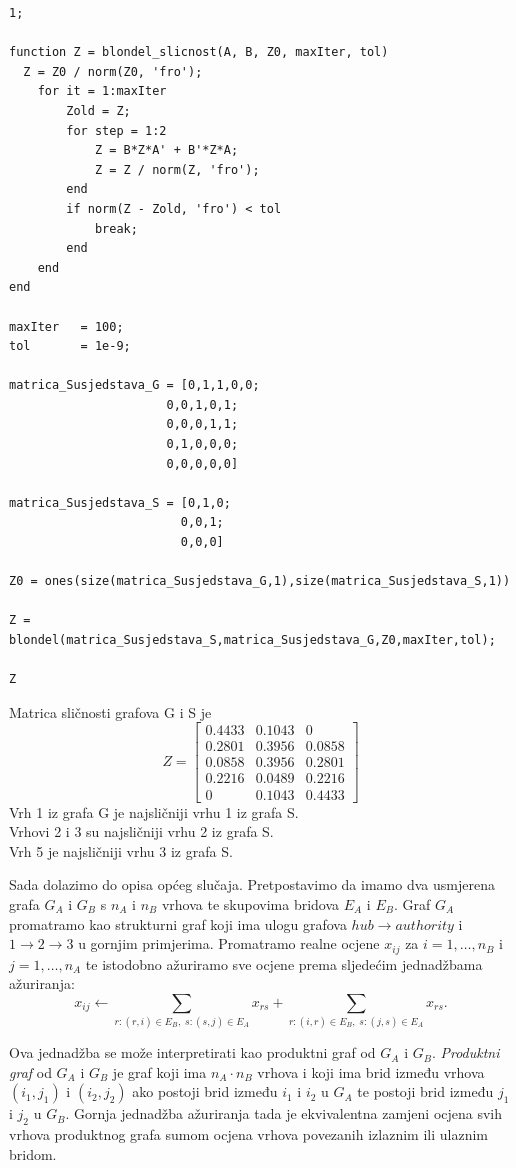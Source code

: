 \documentclass[12pt, letterpaper]{article}
\numberwithin{figure}{section}
\begin{document}
\begin{lstlisting}[style=octave, caption={Implementacija algoritma u Octaveu}, label={lst:blondel}]
1;

function Z = blondel_slicnost(A, B, Z0, maxIter, tol)
  Z = Z0 / norm(Z0, 'fro');
    for it = 1:maxIter
        Zold = Z;
        for step = 1:2
            Z = B*Z*A' + B'*Z*A;
            Z = Z / norm(Z, 'fro');
        end
        if norm(Z - Zold, 'fro') < tol
            break;
        end
    end
end

maxIter   = 100;
tol       = 1e-9;

matrica_Susjedstava_G = [0,1,1,0,0;
                      0,0,1,0,1;
                      0,0,0,1,1;
                      0,1,0,0,0;
                      0,0,0,0,0]

matrica_Susjedstava_S = [0,1,0;
                        0,0,1;
                        0,0,0]

Z0 = ones(size(matrica_Susjedstava_G,1),size(matrica_Susjedstava_S,1))

Z = blondel(matrica_Susjedstava_S,matrica_Susjedstava_G,Z0,maxIter,tol);

Z
\end{lstlisting}
Matrica sličnosti grafova G i S je
\[
Z =
\begin{bmatrix}
0.4433 & 0.1043 & 0 \\
0.2801 & 0.3956 & 0.0858 \\
0.0858 & 0.3956 & 0.2801 \\
0.2216 & 0.0489 & 0.2216 \\
0 & 0.1043 & 0.4433
\end{bmatrix}
\]
Vrh 1 iz grafa G je najsličniji vrhu 1 iz grafa S.\\
Vrhovi 2 i 3 su najsličniji vrhu 2 iz grafa S.\\
Vrh 5 je najsličniji vrhu 3 iz grafa S.

Sada dolazimo do opisa općeg slučaja. Pretpostavimo da imamo dva usmjerena grafa $G_A$ i $G_B$ s $n_A$ i $n_B$ vrhova te skupovima bridova $E_A$ i $E_B$. Graf $G_A$ promatramo kao strukturni graf koji ima ulogu grafova $\mathit{hub} \longrightarrow \mathit{authority}$ i $1 \longrightarrow 2 \longrightarrow 3$ u gornjim primjerima. Promatramo realne ocjene $x_{ij}$ za $i = 1, \dots, n_B$ i $j = 1, \dots, n_A$ te istodobno ažuriramo sve ocjene prema sljedećim jednadžbama ažuriranja:
\[
x_{ij} \leftarrow \sum_{r:(r,i)\in E_B,\; s:(s,j)\in E_A} x_{rs} + \sum_{r:(i,r)\in E_B,\; s:(j,s)\in E_A} x_{rs}.
\]


Ova jednadžba se može interpretirati kao produktni graf od $G_A$ i $G_B$. \emph{Produktni graf} od $G_A$ i $G_B$ je graf koji ima $n_A \cdot n_B$ vrhova i koji ima brid između vrhova $(i_1, j_1)$ i $(i_2, j_2)$ ako postoji brid između $i_1$ i $i_2$ u $G_A$ te postoji brid između $j_1$ i $j_2$ u $G_B$. Gornja jednadžba ažuriranja tada je ekvivalentna zamjeni ocjena svih vrhova produktnog grafa sumom ocjena vrhova povezanih izlaznim ili ulaznim bridom.
\end{document}
